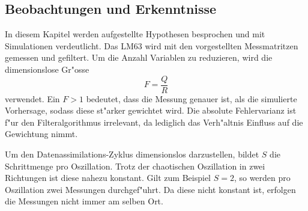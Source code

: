 \begin{refsection}
\section{Beobachtungen und Erkenntnisse}
In diesem Kapitel werden aufgestellte Hypothesen besprochen und mit Simulationen verdeutlicht. Das LM63 wird mit den vorgestellten Messmatritzen gemessen und gefiltert. Um die Anzahl Variablen zu reduzieren, wird die dimensionslose Gr"osse
\[
F=\frac{Q}{R}
\]
verwendet. Ein $F>1$ bedeutet, dass die Messung genauer ist, als die simulierte Vorhersage, sodass diese st"arker gewichtet wird. Die absolute Fehlervarianz ist f"ur den Filteralgorithmus irrelevant, da lediglich das Verh"altnis Einfluss auf die Gewichtung nimmt.

Um den Datenassimilations-Zyklus dimensionslos darzustellen, bildet $S$ die Schrittmenge pro Oszillation. Trotz der chaotischen Oszillation in zwei Richtungen ist diese nahezu konstant. Gilt zum Beispiel $S=2$, so werden pro Oszillation zwei Messungen durchgef"uhrt. Da diese nicht konstant ist, erfolgen die Messungen nicht immer am selben Ort.


\end{refsection}
